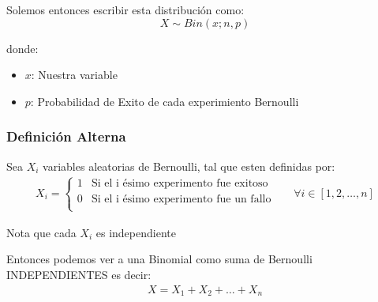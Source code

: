 \documentclass[12pt, fleqn]{report}                             %
\DeclareMathOperator \Space {\quad}                             %
\theoremstyle{break}                                            %
\begin{document}
                    Solemos entonces escribir esta distribución como:
                    \begin{equation*}
                        X \sim Bin(x; n, p)
                    \end{equation*}

                    donde:
                    \begin{itemize}
                        \item $x$: Nuestra variable
                        \item $p$: Probabilidad de Exito de cada experimiento Bernoulli
                    \end{itemize}


                \vspace{1em}
                \subsubsection{Definición Alterna}

                    Sea $X_i$ variables aleatorias de Bernoulli, tal que esten
                    definidas por: 
                    \begin{align*}
                        X_i = 
                            \begin{cases}
                                1 & \text{Si el i ésimo experimento fue exitoso}        \\
                                0 & \text{Si el i ésimo experimento fue un fallo}       \\
                            \end{cases}
                            \Space
                            \forall i \in [1, 2, \dots, n]
                    \end{align*}

                    Nota que cada $X_i$ es independiente

                    Entonces podemos ver a una Binomial como suma de Bernoulli INDEPENDIENTES es decir:
                    \begin{align*}
                        X = X_1 + X_2 + \dots + X_n
                    \end{align*}
\end{document}
